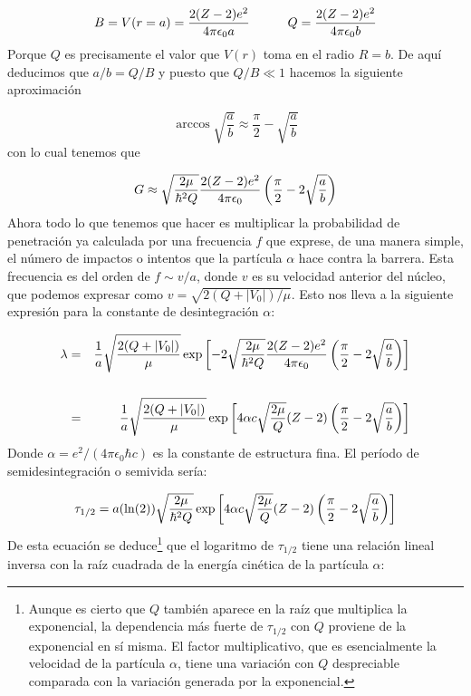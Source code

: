 \begin{equation}
    B= V(r=a) = \frac{2(Z-2)e^2}{4\pi \epsilon_0 a} \quad \quad \quad Q=\frac{2(Z-2)e^2}{4 \pi \epsilon_0 b}
\end{equation}
Porque $Q$ es precisamente el valor que $V(r)$ toma en el radio $R=b$. De aquí deducimos que $a/b=Q/B$ y puesto que $Q/B\ll 1$ hacemos la siguiente aproximación 

\begin{equation}
    \arccos \sqrt{\frac{a}{b}} \approx \frac{\pi}{2} - \sqrt{\frac{a}{b}}
\end{equation}
con lo cual tenemos que 

\begin{equation}
    G \approx  \sqrt{\frac{2\mu}{\hbar^2Q}} \frac{2(Z-2)e^2}{4 \pi \epsilon_0} \left( \frac{\pi}{2} -2 \sqrt{\frac{a}{b}} \right)
\end{equation}
Ahora todo lo que tenemos que hacer es multiplicar la probabilidad de penetración ya calculada por una frecuencia $f$ que exprese, de una manera simple, el número de impactos o intentos que la partícula $\alpha$ hace contra la barrera. Esta frecuencia es del orden de $f \sim v/a$, donde $v$ es su velocidad anterior del núcleo, que podemos expresar como $v=\sqrt{2(Q+|V_0|)/\mu}$. Esto nos lleva a la siguiente expresión para la constante de desintegración $\alpha$:

\begin{eqnarray}
    \lambda & = & \frac{1}{a} \sqrt{\frac{2(Q+|V_0|)}{\mu}} \exp \left[ -2  \sqrt{\frac{2 \mu}{\hbar^2 Q}} \frac{2(Z-2)e^2}{4 \pi \epsilon_0} \left( \frac{\pi}{2}-2\sqrt{\frac{a}{b}} \right) \right] \\ \\
            & = & \frac{1}{a} \sqrt{\frac{2(Q+|V_0|)}{\mu}}  \exp \left[ 4 \alpha c \sqrt{\frac{2 \mu}{Q}} (Z-2) \left( \frac{\pi}{2}-2\sqrt{\frac{a}{b}} \right) \right]
\end{eqnarray}
Donde $\alpha=e^2/(4 \pi \epsilon_0 \hbar c)$ es la constante de estructura fina. El período de semidesintegración o semivida sería:

\begin{equation}
    \tau_{1/2} = a (\ln (2)) \sqrt{\frac{2\mu}{\hbar^2Q}} \exp \left[ 4 \alpha c \sqrt{\frac{2 \mu}{Q}} (Z-2) \left( \frac{\pi}{2}-2\sqrt{\frac{a}{b}} \right) \right]
\end{equation}
De esta ecuación se deduce\footnote{Aunque es cierto que $Q$ también aparece en la raíz que multiplica la exponencial, la dependencia más fuerte de $\tau_{1/2}$ con $Q$ proviene de la exponencial en sí misma. El factor multiplicativo, que es esencialmente la velocidad de la partícula $\alpha$, tiene una variación con $Q$ despreciable comparada con la variación generada por la exponencial.} que el logaritmo de $\tau_{1/2}$ tiene una relación lineal inversa con la raíz cuadrada de la energía cinética de la partícula $\alpha$:

